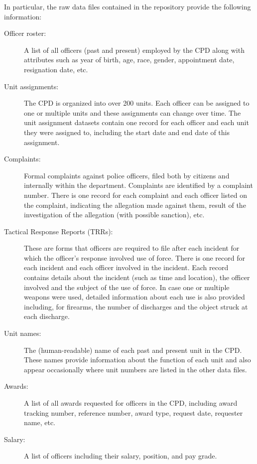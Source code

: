In particular, the raw data files contained in the repository
provide the following information:
\begin{description}
	\item[Officer roster:] A list of all officers (past and present) employed
		by the CPD along with attributes such as year of birth, age, race,
		gender, appointment date, resignation date, etc.
	\item[Unit assignments:] The CPD is organized into over 200 units.
		Each officer can be assigned to one or multiple units and these
		assignments can change over time. The unit assignment datasets contain
		one record for each officer and each unit they were assigned to, including
		the start date and end date of this assignment.
	\item[Complaints:] Formal complaints against police officers, filed both by
		citizens and internally within the department. Complaints are
		identified by a complaint number. There is one record for each
		complaint and each officer listed on the complaint, indicating the
		allegation made against them, result of the investigation of the
		allegation (with possible sanction), etc.
	\item[Tactical Response Reports (TRRs):] These are forms that officers are
		required to file after each incident for which the officer's response
		involved use of force. There is one record for each incident and each
		officer involved in the incident. Each record contains details about
		the incident (such as time and location), the officer involved and the
		subject of the use of force. In case one or multiple weapons were used,
		detailed information about each use is also provided including, for
		firearms, the number of discharges and the object struck at each
		discharge.
	\item[Unit names:] The (human-readable) name of each past and present
		unit in the CPD. These names provide information about the function of
		each unit and also appear occasionally where unit numbers are listed in
		the other data files.
	\item[Awards:] A list of all awards requested for officers in the CPD,
		including award tracking number, reference number, award type, request
		date, requester name, etc.
	\item[Salary:] A list of officers including their salary, position, and pay grade.
\end{description}


